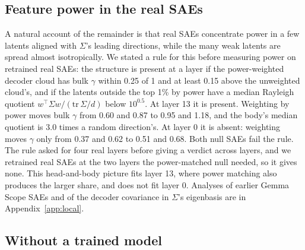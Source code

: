 \documentclass{article}
\newcommand{\Sig}{\Sigma}
\begin{document}
\subsection{Feature power in the real SAEs}
\label{sec:what}

A natural account of the remainder is that real SAEs concentrate power in a few latents aligned with $\Sig$'s leading directions, while the many weak latents are spread almost isotropically. We stated a rule for this before measuring power on retrained real SAEs: the structure is present at a layer if the power-weighted decoder cloud has bulk $\gamma$ within 0.25 of 1 and at least 0.15 above the unweighted cloud's, and if the latents outside the top 1\% by power have a median Rayleigh quotient $w^\top\Sig w/(\mathrm{tr}\,\Sig/d)$ below $10^{0.5}$. At layer 13 it is present. Weighting by power moves bulk $\gamma$ from 0.60 and 0.87 to 0.95 and 1.18, and the body's median quotient is 3.0 times a random direction's. At layer 0 it is absent: weighting moves $\gamma$ only from 0.37 and 0.62 to 0.51 and 0.68. Both null SAEs fail the rule. The rule asked for four real layers before giving a verdict across layers, and we retrained real SAEs at the two layers the power-matched null needed, so it gives none. This head-and-body picture fits layer 13, where power matching also produces the larger share, and does not fit layer 0. Analyses of earlier Gemma Scope SAEs and of the decoder covariance in $\Sig$'s eigenbasis are in Appendix~\ref{app:local}.

\subsection{Without a trained model}
\label{sec:ladder}

\begin{table}[t]
\centering
\caption{The real / equal-power / power-matched comparison with and without a trained model, $k=40$, $\gamma$ at 8,192 live latents. Each dataset has its own $\Sig$. FVU: mean of the three real SAEs; $\rho$: the dense share at which both nulls matched it (within 0.03). $R$: real, three seeds; $Z$: equal-power null, two seeds; $N$: power-matched null, one seed; $G=Z-R$; Rem $=N-R$. embT: trained Gemma-2-2B input embeddings; embR: random embedding matrix; randL0, randL13: blocks 0 and 13 of a randomly initialised Gemma-2-2B. Gemma rows are the existing results ($Z$ two seeds, $N$ the first run's seed 0, as the rule specifies). Verdict by the rule fixed in advance, against the Gemma row above it; in brackets the ratio of the random dataset's remainder to the trained one in the two bulk windows (``persists'' needs at least 0.70 in both). $^\dagger$The rule's verdict; we read randL13 as uninformative in practice (see text).}
\label{tab:ladder}
\footnotesize
\setlength{\tabcolsep}{3pt}

\end{table}
\end{document}
